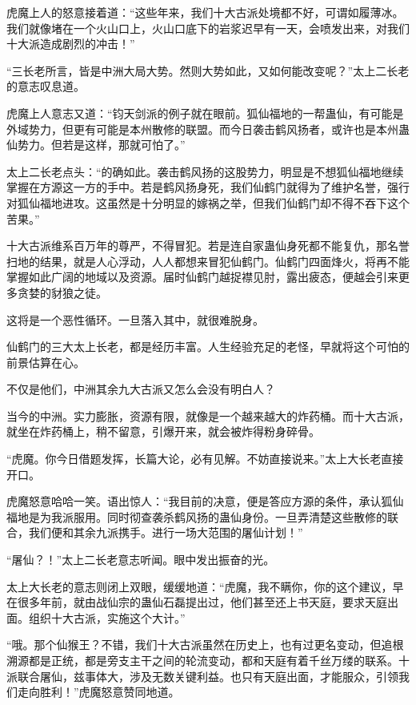 
\begin{this_body}



虎魔上人的怒意接着道：“这些年来，我们十大古派处境都不好，可谓如履薄冰。我们就像堵在一个火山口上，火山口底下的岩浆迟早有一天，会喷发出来，对我们十大派造成剧烈的冲击！”

“三长老所言，皆是中洲大局大势。然则大势如此，又如何能改变呢？”太上二长老的意志叹息道。

虎魔上人意志又道：“钧天剑派的例子就在眼前。狐仙福地的一帮蛊仙，有可能是外域势力，但更有可能是本州散修的联盟。而今日袭击鹤风扬者，或许也是本州蛊仙势力。但若是这样，那就可怕了。”

太上二长老点头：“的确如此。袭击鹤风扬的这股势力，明显是不想狐仙福地继续掌握在方源这一方的手中。若是鹤风扬身死，我们仙鹤门就得为了维护名誉，强行对狐仙福地进攻。这虽然是十分明显的嫁祸之举，但我们仙鹤门却不得不吞下这个苦果。”

十大古派维系百万年的尊严，不得冒犯。若是连自家蛊仙身死都不能复仇，那名誉扫地的结果，就是人心浮动，人人都想来冒犯仙鹤门。仙鹤门四面烽火，将再不能掌握如此广阔的地域以及资源。届时仙鹤门越捉襟见肘，露出疲态，便越会引来更多贪婪的豺狼之徒。

这将是一个恶性循环。一旦落入其中，就很难脱身。

仙鹤门的三大太上长老，都是经历丰富。人生经验充足的老怪，早就将这个可怕的前景估算在心。

不仅是他们，中洲其余九大古派又怎么会没有明白人？

当今的中洲。实力膨胀，资源有限，就像是一个越来越大的炸药桶。而十大古派，就坐在炸药桶上，稍不留意，引爆开来，就会被炸得粉身碎骨。

“虎魔。你今日借题发挥，长篇大论，必有见解。不妨直接说来。”太上大长老直接开口。

虎魔怒意哈哈一笑。语出惊人：“我目前的决意，便是答应方源的条件，承认狐仙福地是为我派服用。同时彻查袭杀鹤风扬的蛊仙身份。一旦弄清楚这些散修的联合，我们便和其余九派携手。进行一场大范围的屠仙计划！”

“屠仙？！”太上二长老意志听闻。眼中发出振奋的光。

太上大长老的意志则闭上双眼，缓缓地道：“虎魔，我不瞒你，你的这个建议，早在很多年前，就由战仙宗的蛊仙石磊提出过，他们甚至还上书天庭，要求天庭出面。组织十大古派，实施这个大计。”

“哦。那个仙猴王？不错，我们十大古派虽然在历史上，也有过更名变动，但追根溯源都是正统，都是旁支主干之间的轮流变动，都和天庭有着千丝万缕的联系。十派联合屠仙，兹事体大，涉及无数关键利益。也只有天庭出面，才能服众，引领我们走向胜利！”虎魔怒意赞同地道。


\end{this_body}
